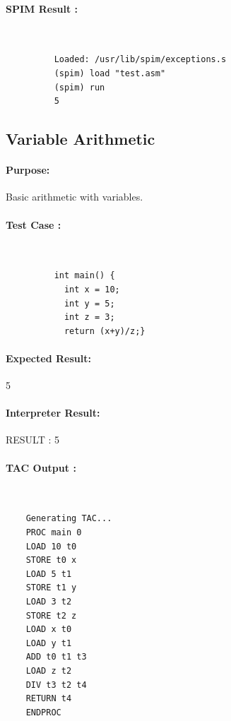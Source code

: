 \documentclass[12pt]{article}
\begin{document}
\paragraph{SPIM Result :}~\\
\begin{figure}[H]
  \begin{lstlisting}
    Loaded: /usr/lib/spim/exceptions.s
    (spim) load "test.asm"
    (spim) run
    5
  \end{lstlisting}
\end{figure}
\subsection{Variable Arithmetic}
\paragraph{Purpose:} Basic arithmetic with variables.
\paragraph{Test Case :}~\\
\begin{figure}[H]
  \begin{lstlisting}
    int main() {
      int x = 10;
      int y = 5; 
      int z = 3; 
      return (x+y)/z;}
  \end{lstlisting}
\end{figure}
\paragraph{Expected Result:} 5
\paragraph{Interpreter Result:}RESULT : 5
\paragraph{TAC Output : }~\\
  \begin{lstlisting}
    Generating TAC...
    PROC main 0
    LOAD 10 t0
    STORE t0 x
    LOAD 5 t1
    STORE t1 y
    LOAD 3 t2
    STORE t2 z
    LOAD x t0
    LOAD y t1
    ADD t0 t1 t3
    LOAD z t2
    DIV t3 t2 t4
    RETURN t4
    ENDPROC
  \end{lstlisting}
\end{document}
